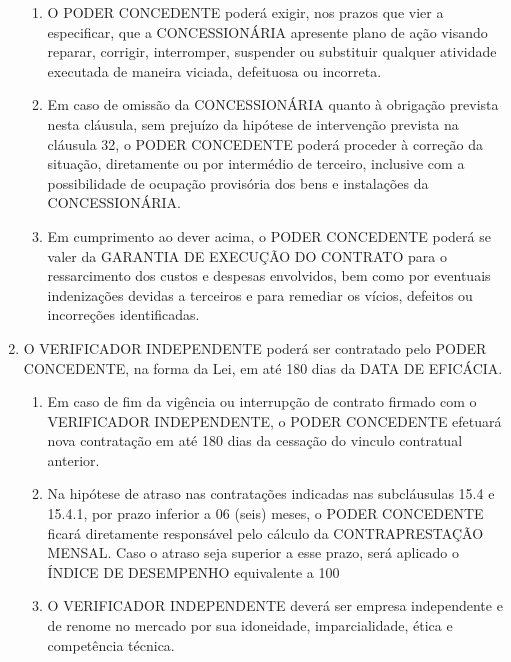 \documentclass[a4paper,11pt]{report} %
\begin{document}
\begin{enumerate}
\begin{enumerate}[label*=\arabic*.]
\item \label{itm:76GP} O PODER CONCEDENTE poderá exigir, nos prazos que vier a especificar, que a CONCESSIONÁRIA apresente plano de ação visando reparar, corrigir, interromper, suspender ou substituir qualquer atividade executada de maneira viciada, defeituosa ou incorreta.

\item \label{itm:MLCT} Em caso de omissão da CONCESSIONÁRIA quanto à obrigação prevista nesta cláusula, sem prejuízo da hipótese de intervenção prevista na cláusula 32, o PODER CONCEDENTE poderá proceder à correção da situação, diretamente ou por intermédio de terceiro, inclusive com a possibilidade de ocupação provisória dos bens e instalações da CONCESSIONÁRIA.

\item \label{itm:4U3S} Em cumprimento ao dever acima, o PODER CONCEDENTE poderá se valer da GARANTIA DE EXECUÇÃO DO CONTRATO para o ressarcimento dos custos e despesas envolvidos, bem como por eventuais indenizações devidas a terceiros e para remediar os vícios, defeitos ou incorreções identificadas.
\end{enumerate}

\item \label{itm:9EVZ} O VERIFICADOR INDEPENDENTE poderá ser contratado pelo PODER CONCEDENTE, na forma da Lei, em até 180 dias da DATA DE EFICÁCIA.

\begin{enumerate}[label*=\arabic*.]
\item \label{itm:SXBP} Em caso de fim da vigência ou interrupção de contrato firmado com o VERIFICADOR INDEPENDENTE, o PODER CONCEDENTE efetuará nova contratação em até 180 dias da cessação do vinculo contratual anterior.

\item \label{itm:7GVD} Na hipótese de atraso nas contratações indicadas nas subcláusulas 15.4 e 15.4.1, por prazo inferior a 06 (seis) meses, o PODER CONCEDENTE ficará diretamente responsável pelo cálculo da CONTRAPRESTAÇÃO MENSAL. Caso o atraso seja superior a esse prazo, será aplicado o ÍNDICE DE DESEMPENHO equivalente a 100%

\item \label{itm:GWL2} O VERIFICADOR INDEPENDENTE deverá ser empresa independente e de renome no mercado por sua idoneidade, imparcialidade, ética e competência técnica.


\end{enumerate}
\end{enumerate}
\end{document}
